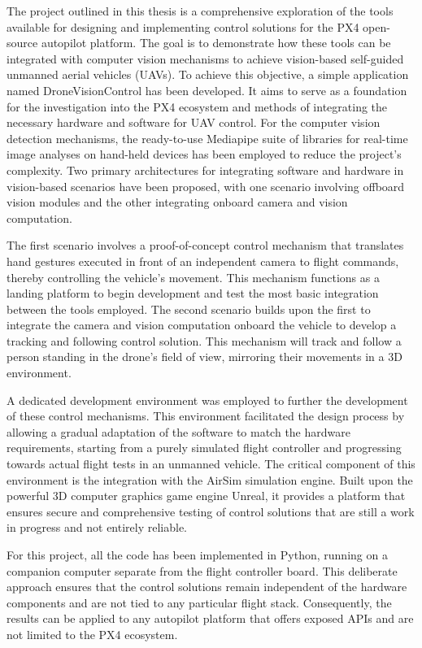 The project outlined in this thesis is a comprehensive exploration of the tools available for designing and implementing control solutions for the PX4 open-source autopilot platform. The goal is to demonstrate how these tools can be integrated with computer vision mechanisms to achieve vision-based self-guided unmanned aerial vehicles (UAVs).
To achieve this objective, a simple application named DroneVisionControl has been developed. It aims to serve as a foundation for the investigation into the PX4 ecosystem and methods of integrating the necessary hardware and software for UAV control.
For the computer vision detection mechanisms, the ready-to-use Mediapipe suite of libraries for real-time image analyses on hand-held devices has been employed to reduce the project's complexity.
Two primary architectures for integrating software and hardware in vision-based scenarios have been proposed, with one scenario involving offboard vision modules and the other integrating onboard camera and vision computation. 

The first scenario involves a proof-of-concept control mechanism that translates hand gestures executed in front of an independent camera to flight commands, thereby controlling the vehicle's movement. This mechanism functions as a landing platform to begin development and test the most basic integration between the tools employed.
The second scenario builds upon the first to integrate the camera and vision computation onboard the vehicle to develop a tracking and following control solution. This mechanism will track and follow a person standing in the drone's field of view, mirroring their movements in a 3D environment.

A dedicated development environment was employed to further the development of these control mechanisms. This environment facilitated the design process by allowing a gradual adaptation of the software to match the hardware requirements, starting from a purely simulated flight controller and progressing towards actual flight tests in an unmanned vehicle.
The critical component of this environment is the integration with the AirSim simulation engine. Built upon the powerful 3D computer graphics game engine Unreal, it provides a platform that ensures secure and comprehensive testing of control solutions that are still a work in progress and not entirely reliable.

For this project, all the code has been implemented in Python, running on a companion computer separate from the flight controller board. This deliberate approach ensures that the control solutions remain independent of the hardware components and are not tied to any particular flight stack. Consequently, the results can be applied to any autopilot platform that offers exposed APIs and are not limited to the PX4 ecosystem.

